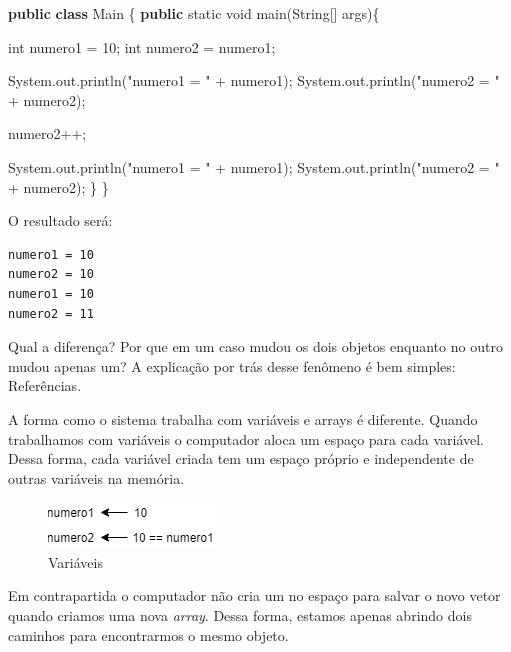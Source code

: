 \documentclass[
]{book}
\newenvironment{Shaded}{\begin{snugshade}}{\end{snugshade}}
\newcommand{\BuiltInTok}[1]{#1}
\newcommand{\DataTypeTok}[1]{\textcolor[rgb]{0.13,0.29,0.53}{#1}}
\newcommand{\DecValTok}[1]{\textcolor[rgb]{0.00,0.00,0.81}{#1}}
\newcommand{\FunctionTok}[1]{\textcolor[rgb]{0.00,0.00,0.00}{#1}}
\newcommand{\KeywordTok}[1]{\textcolor[rgb]{0.13,0.29,0.53}{\textbf{#1}}}
\newcommand{\NormalTok}[1]{#1}
\newcommand{\StringTok}[1]{\textcolor[rgb]{0.31,0.60,0.02}{#1}}
\begin{document}
\begin{Shaded}
\begin{Highlighting}[]
\KeywordTok{public} \KeywordTok{class}\NormalTok{ Main \{}
    \KeywordTok{public} \DataTypeTok{static} \DataTypeTok{void} \FunctionTok{main}\NormalTok{(}\BuiltInTok{String}\NormalTok{[] args)\{}

        \DataTypeTok{int}\NormalTok{ numero1 = }\DecValTok{10}\NormalTok{;}
        \DataTypeTok{int}\NormalTok{ numero2 = numero1;}

        \BuiltInTok{System}\NormalTok{.}\FunctionTok{out}\NormalTok{.}\FunctionTok{println}\NormalTok{(}\StringTok{"numero1 = "}\NormalTok{ + numero1);}
        \BuiltInTok{System}\NormalTok{.}\FunctionTok{out}\NormalTok{.}\FunctionTok{println}\NormalTok{(}\StringTok{"numero2 = "}\NormalTok{ + numero2);}

\NormalTok{        numero2++;}

        \BuiltInTok{System}\NormalTok{.}\FunctionTok{out}\NormalTok{.}\FunctionTok{println}\NormalTok{(}\StringTok{"numero1 = "}\NormalTok{ + numero1);}
        \BuiltInTok{System}\NormalTok{.}\FunctionTok{out}\NormalTok{.}\FunctionTok{println}\NormalTok{(}\StringTok{"numero2 = "}\NormalTok{ + numero2);}
\NormalTok{    \}}
\NormalTok{\}}
\end{Highlighting}
\end{Shaded}

O resultado será:

\begin{verbatim}
numero1 = 10
numero2 = 10
numero1 = 10
numero2 = 11
\end{verbatim}

Qual a diferença? Por que em um caso mudou os dois objetos enquanto no outro mudou apenas um? A explicação por trás desse fenômeno é bem simples: Referências.

A forma como o sistema trabalha com variáveis e arrays é diferente. Quando trabalhamos com variáveis o computador aloca um espaço para cada variável. Dessa forma, cada variável criada tem um espaço próprio e independente de outras variáveis na memória.

\begin{figure}
\centering
\includegraphics{imagens/Java.png}
\caption{Variáveis}
\end{figure}

Em contrapartida o computador não cria um no espaço para salvar o novo vetor quando criamos uma nova \emph{array}. Dessa forma, estamos apenas abrindo dois caminhos para encontrarmos o mesmo objeto.
\end{document}
